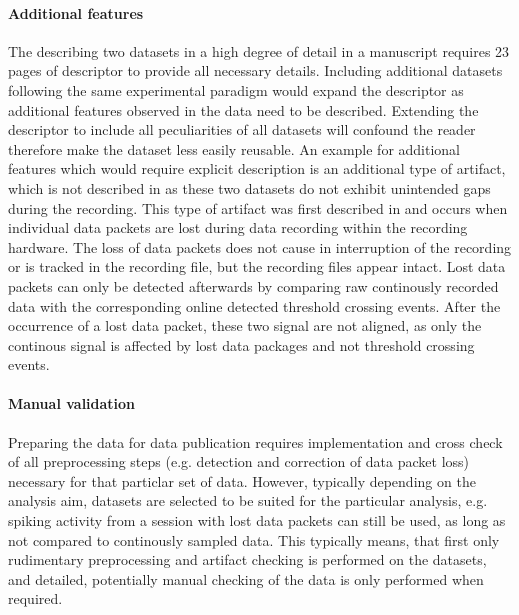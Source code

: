 \paragraph{Additional features}
\label{sec:additional_features_gaps}
The describing two datasets in a high degree of detail in a manuscript requires 23 pages of descriptor to provide all necessary details. Including additional datasets following the same experimental paradigm would expand the descriptor as additional features observed in the data need to be described. Extending the descriptor to include all peculiarities of all datasets will confound the reader therefore make the dataset less easily reusable.
An example for additional features which would require explicit description is an additional type of artifact, which is not described in \citet{Brochier_2018} as these two datasets do not exhibit unintended gaps during the recording. This type of artifact was first described in \citet{Sprenger_2014} and occurs when individual data packets are lost during data recording within the recording hardware. The loss of data packets does not cause in interruption of the recording or is tracked in the recording file, but the recording files appear intact. Lost data packets can only be detected afterwards by comparing raw continously recorded data with the corresponding online detected threshold crossing events. After the occurrence of a lost data packet, these two signal are not aligned, as only the continous signal is affected by lost data packages and not threshold crossing events.

\paragraph{Manual validation}
Preparing the data for data publication requires implementation and cross check of all preprocessing steps (e.g. detection and correction of data packet loss) necessary for that particlar set of data. However, typically depending on the analysis aim, datasets are selected to be suited for the particular analysis, e.g. spiking activity from a session with lost data packets can still be used, as long as not compared to continously sampled data.  This typically means, that first only rudimentary preprocessing and artifact checking is performed on the datasets, and detailed, potentially manual checking of the data is only performed when required. 

